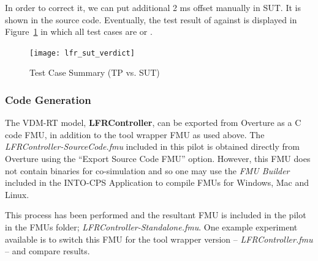 In order to correct it, we can put additional 2 ms offset manually in SUT. It is shown in the source code. Eventually, the test result of  against  is displayed in Figure~\ref{fig:lfr_testcase_sum_sut} in which all test cases are  or .
\begin{figure}[htb!]
    \centering
	\texttt{[image: lfr\_sut\_verdict]}
    \caption{Test Case Summary (TP vs. SUT)}
    \label{fig:lfr_testcase_sum_sut}
\end{figure}

\subsubsection{Code Generation}

The VDM-RT model, \textbf{LFRController}, can be exported from Overture as a C code FMU, in addition to the tool wrapper FMU as used above. The \emph{LFRController-SourceCode.fmu} included in this pilot is obtained directly from Overture using the ``Export Source Code FMU'' option. However, this FMU does not contain binaries for co-simulation and so one may use the \emph{FMU Builder} included in the INTO-CPS Application to compile FMUs for Windows, Mac and Linux. 

This process has been performed and the resultant FMU is included in the pilot in the FMUs folder;  \emph{LFRController-Standalone.fmu}. One example experiment available is to switch this FMU for the tool wrapper version -- \emph{LFRController.fmu} -- and compare results. 
